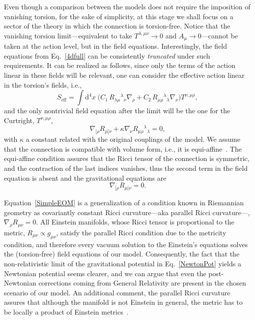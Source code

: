 \documentclass[aps,prd,12pt,twocolumn,superscriptaddress,showpacs,showkeys,reprint%
]{revtex4-1}
\newcommand\nab[1]{\nabla_{{#1}}}
\renewcommand{\(}{\left(}
\renewcommand{\)}{\right)}
\renewcommand{\[}{\left[}
\renewcommand{\]}{\right]}
\newcommand{\dn}[2]{{\mathrm{d}}^{#1}{#2}\;}
\newcommand{\hl}[1]{{\color{red} \bfseries{#1}}}
\begin{document}
Even though a comparison between the models does not require the imposition of vanishing torsion, for the sake of simplicity, at this stage we shall focus on a sector of the theory in which the connection is torsion-free. Notice that the vanishing torsion limit---equivalent to take $T^{\lambda,\mu\nu} \to 0$ and $A_\mu \to 0$---cannot be taken at the action level, but in the field equations. Interestingly, the field equations from Eq.~\eqref{4dfull} can be consistently \emph{truncated} under such requirements. It can be realized as follows, since only the terms of the action linear in these fields will be relevant, one can consider the effective action linear in the torsion's fields, i.e.,
\begin{equation}
  \label{eff-action}
  S_{\text{eff}} = \int\dn{4}{x} \Big( C_1\, R_{\lambda\mu}{}^{\lambda}{}_\nu \nabla_\rho %
  + C_2 \, R_{\mu\rho}{}^{\lambda}{}_\lambda \nabla_\nu \Big) T^{\nu,\mu\rho} ,
\end{equation}
and the only nontrivial field equation after the limit will be the one for the Curtright, $T^{\nu,\mu\rho}$,
\begin{equation}
  \nab{[\rho} R_{\mu]\nu} + \kappa \nab{\nu} R_{\mu\rho}{}^\lambda{}_\lambda = 0,
  \label{almostSimpleEOM}
\end{equation}
with $\kappa$ a constant related with the original couplings of the model. We assume that the connection is compatible with volume form, i.e., it is equi-affine~\cite{nomizu1994affine,MO-Bryant02}.  The equi-affine condition assures that the Ricci tensor of the connection is symmetric, and the contraction of the last indices vanishes, thus the second term in the field equation is absent and the gravitational equations are
\begin{equation}
  \nab{[\rho} R_{\mu]\nu} = 0.
  \label{SimpleEOM}
\end{equation}

Equation~\eqref{SimpleEOM} is a generalization of a condition known in Riemannian geometry as covariantly constant Ricci curvature---aka parallel Ricci curvature---, \mbox{$\nab{\rho} R_{\mu\nu} = 0$.}  All Einstein manifolds, whose Ricci tensor is proportional to the metric, \mbox{$R_{\mu\nu} \propto g_{\mu\nu}$,} satisfy the parallel Ricci condition due to the metricity condition, and therefore every vacuum solution to the Einstein's equations solves the (torsion-free) field equations of our model. Consequently, the fact that the non-relativistic limit of the gravitational potential in Eq.~\eqref{NewtonPot} yields a Newtonian potential seems clearer, and we can argue that even the post-Newtonian corrections coming from General Relativity are present in the chosen scenario of our model. An additional comment, the parallel Ricci curvature assures that although the manifold is not Einstein in general, the metric has to be locally a product of Einstein metrics~\cite{Besse}.
\end{document}
